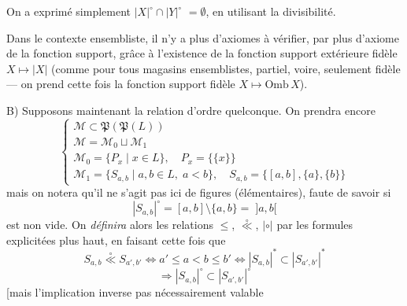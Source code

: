 \documentclass[11pt,a4paper]{article}
\begin{document}
On a exprimé simplement $|X|^\circ \cap |Y|^\circ$ \struck{\ill{}} $= \emptyset$, en utilisant la divisibilité.

Dans le contexte ensembliste, il n'y a  plus d'axiomes à vérifier, par \ill{} plus d'axiome \struck{\ill{}} de la fonction support, grâce à l'existence de la fonction  support extérieure fidèle $X \mapsto |X|$ (comme pour tous magasins ensemblistes,  partiel, voire, seulement fidèle — on prend cette fois la fonction support fidèle $X \mapsto \mathrm{Omb}\,X$).

B) Supposons maintenant la relation d'ordre quelconque. On prendra encore
\[
\begin{cases}
\mathcal{M} \subset \mathfrak{P}(\mathfrak{P}(L))\\
\mathcal{M} = \mathcal{M}_0 \sqcup \mathcal{M}_1\\
\mathcal{M}_0 = \{P_x \mid x\in L\}, \quad P_x = \{\{x\}\}\\
\mathcal{M}_1 = \{S_{a,b} \mid a,b\in L,\; a<b\}, \quad S_{a,b} = \{[a,b],\{a\},\{b\}\}
\end{cases}
\]
mais on notera qu'il ne s'agit pas ici de figures (élémentaires), faute de savoir si
\[
|S_{a,b}|^\circ = [a,b]\setminus\{a,b\} = \;]a,b[
\]
est non vide. On \textit{définira} alors les relations $\le$, $\overset{\circ}{\ll}$, $|{\circ}|$ par les formules explicitées plus haut, en faisant  cette fois que
\[
S_{a,b} \overset{\circ}{\ll} S_{a',b'} \Longleftrightarrow a'\le a<b\le b' \Longleftrightarrow |S_{a,b}|^* \subset |S_{a',b'}|^*
\]
\[
\Longrightarrow |S_{a,b}|^\circ \subset |S_{a',b'}|^\circ
\]
[mais l'implication inverse pas nécessairement valable


\end{document}
